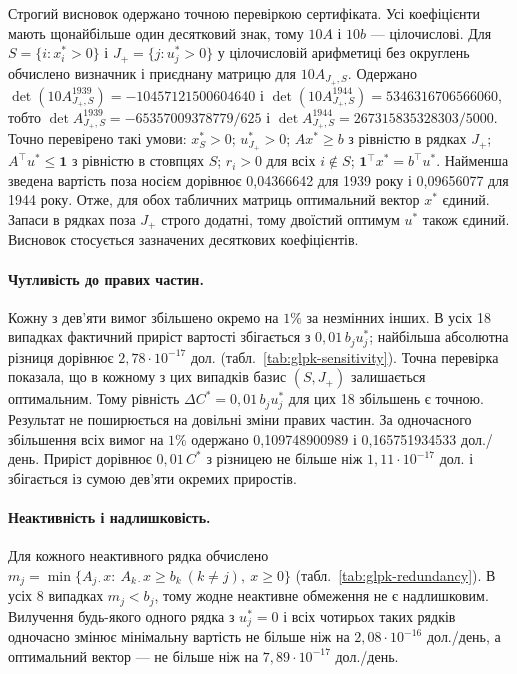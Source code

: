 Строгий висновок одержано точною перевіркою сертифіката. Усі коефіцієнти мають щонайбільше один десятковий знак, тому $10A$ і $10b$ --- цілочислові. Для $S=\{i:x_i^*>0\}$ і $J_+=\{j:u_j^*>0\}$ у цілочисловій арифметиці без округлень обчислено визначник і приєднану матрицю для $10A_{J_+,S}$. Одержано $\det(10A^{1939}_{J_+,S})=-10457121500604640$ і $\det(10A^{1944}_{J_+,S})=5346316706566060$, тобто $\det A^{1939}_{J_+,S}=-65357009378779/625$ і $\det A^{1944}_{J_+,S}=267315835328303/5000$. Точно перевірено такі умови: $x_S^*>0$; $u_{J_+}^*>0$; $Ax^*\ge b$ з рівністю в рядках $J_+$; $A^\top u^*\le\mathbf1$ з рівністю в стовпцях $S$; $r_i>0$ для всіх $i\notin S$; $\mathbf1^\top x^*=b^\top u^*$. Найменша зведена вартість поза носієм дорівнює 0{,}04366642 для 1939 року і 0{,}09656077 для 1944 року. Отже, для обох табличних матриць оптимальний вектор $x^*$ єдиний. Запаси в рядках поза $J_+$ строго додатні, тому двоїстий оптимум $u^*$ також єдиний. Висновок стосується зазначених десяткових коефіцієнтів.

\paragraph{Чутливість до правих частин.}
Кожну з дев’яти вимог збільшено окремо на $1\%$ за незмінних інших. В усіх 18 випадках фактичний приріст вартості збігається з $0{,}01\,b_ju_j^*$; найбільша абсолютна різниця дорівнює $2{,}78\cdot10^{-17}$ дол. (табл.~\ref{tab:glpk-sensitivity}). Точна перевірка показала, що в кожному з цих випадків базис $(S,J_+)$ залишається оптимальним. Тому рівність $\Delta C^*=0{,}01\,b_ju_j^*$ для цих 18 збільшень є точною. Результат не поширюється на довільні зміни правих частин. За одночасного збільшення всіх вимог на $1\%$ одержано 0{,}109748900989 і 0{,}165751934533 дол./день. Приріст дорівнює $0{,}01\,C^*$ з різницею не більше ніж $1{,}11\cdot10^{-17}$ дол. і збігається із сумою дев’яти окремих приростів.

\paragraph{Неактивність і надлишковість.}
Для кожного неактивного рядка обчислено $m_j=\min\{A_{j\cdot}x:\ A_{k\cdot}x\ge b_k\ (k\ne j),\ x\ge0\}$ (табл.~\ref{tab:glpk-redundancy}). В усіх 8 випадках $m_j<b_j$, тому жодне неактивне обмеження не є надлишковим. Вилучення будь-якого одного рядка з $u_j^*=0$ і всіх чотирьох таких рядків одночасно змінює мінімальну вартість не більше ніж на $2{,}08\cdot10^{-16}$ дол./день, а оптимальний вектор --- не більше ніж на $7{,}89\cdot10^{-17}$ дол./день.

